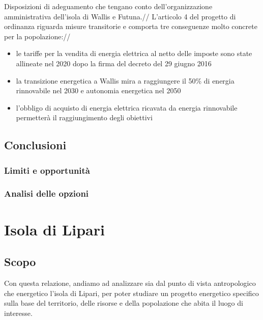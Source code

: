 \documentclass[fleqn,10pt]{SelfArx} %
\begin{document}
Disposizioni di adeguamento che tengano conto dell'organizzazione amministrativa dell'isola di Wallis e Futuna.//
L'articolo 4 del progetto di ordinanza riguarda misure transitorie e comporta tre conseguenze molto concrete per la popolazione://
\begin{itemize}
\item le tariffe per la vendita di energia elettrica al netto delle imposte  sono state allineate nel 2020 dopo la firma del decreto del 29 giugno 2016
\item la transizione energetica a Wallis mira a raggiungere il 50\% di energia rinnovabile nel 2030 e autonomia energetica nel 2050
\item l'obbligo di acquisto di energia elettrica ricavata da energia rinnovabile permetterà il raggiungimento degli obiettivi
\end{itemize}

\subsection{Conclusioni}
\subsubsection{Limiti e opportunità}
\subsubsection{Analisi delle opzioni}

\section{Isola di Lipari}
\subsection{Scopo}
Con questa relazione, andiamo ad analizzare sia dal punto di vista antropologico che energetico l'isola di Lipari, per poter studiare un progetto energetico specifico sulla base del territorio, delle risorse e della popolazione che abita il luogo di interesse.
\end{document}
